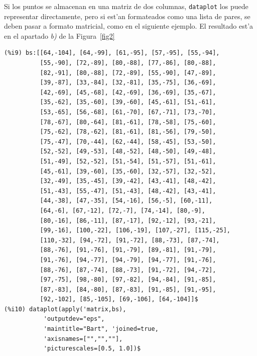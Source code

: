 \documentclass[spanish,12pt,a4paper]{article}
\begin{document}
\begin{description}
Si los puntos se almacenan en una matriz de dos columnas, \verb|dataplot| los puede representar directamente, pero si est'an formateados como una lista de pares, se deben pasar a formato matricial, como en el siguiente ejemplo. El resultado est'a en el apartado \emph{b)} de la Figura~\ref{fig2}
\begin{verbatim}
(%i9) bs:[[64,-104], [64,-99], [61,-95], [57,-95], [55,-94],
          [55,-90], [72,-89], [80,-88], [77,-86], [80,-88], 
          [82,-91], [80,-88], [72,-89], [55,-90], [47,-89], 
          [39,-87], [33,-84], [32,-81], [35,-75], [36,-69], 
          [42,-69], [45,-68], [42,-69], [36,-69], [35,-67], 
          [35,-62], [35,-60], [39,-60], [45,-61], [51,-61], 
          [53,-65], [56,-68], [61,-70], [67,-71], [73,-70], 
          [78,-67], [80,-64], [81,-61], [78,-58], [75,-60], 
          [75,-62], [78,-62], [81,-61], [81,-56], [79,-50], 
          [75,-47], [70,-44], [62,-44], [58,-45], [53,-50], 
          [52,-52], [49,-53], [48,-52], [48,-50], [49,-48], 
          [51,-49], [52,-52], [51,-54], [51,-57], [51,-61], 
          [45,-61], [39,-60], [35,-60], [32,-57], [32,-52], 
          [32,-49], [35,-45], [39,-42], [43,-41], [48,-42], 
          [51,-43], [55,-47], [51,-43], [48,-42], [43,-41], 
          [44,-38], [47,-35], [54,-16], [56,-5], [60,-11], 
          [64,-6], [67,-12], [72,-7], [74,-14], [80,-9], 
          [80,-16], [86,-11], [87,-17], [92,-12], [93,-21], 
          [99,-16], [100,-22], [106,-19], [107,-27], [115,-25], 
          [110,-32], [94,-72], [91,-72], [88,-73], [87,-74], 
          [88,-76], [91,-76], [91,-79], [89,-81], [91,-79], 
          [91,-76], [94,-77], [94,-79], [94,-77], [91,-76], 
          [88,-76], [87,-74], [88,-73], [91,-72], [94,-72], 
          [97,-75], [98,-80], [97,-82], [94,-84], [91,-85], 
          [87,-83], [84,-80], [87,-83], [91,-85], [91,-95], 
          [92,-102], [85,-105], [69,-106], [64,-104]]$
(%i10) dataplot(apply('matrix,bs),
           'outputdev="eps",
           'maintitle="Bart", 'joined=true,
           'axisnames=["","",""],
           'picturescales=[0.5, 1.0])$
\end{verbatim}



\end{description}
\end{document}
